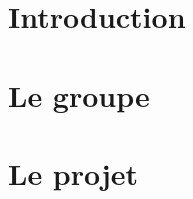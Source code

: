 \documentclass[titlepage, 14px, a4paper]{report}
\begin{document}
\AddToShipoutPicture*{\BackgroundPic}

\maketitle
\tableofcontents


\newpage
{}
\part{Introduction}
    
    \newpage 

\part{Le groupe}
    
    \newpage 

\part{Le projet}
    
    \newpage 


%    
\end{document}

